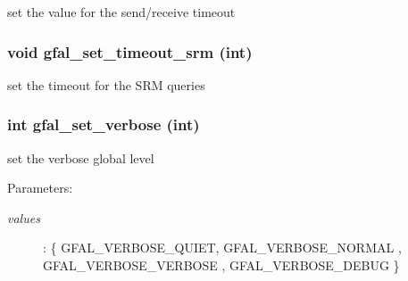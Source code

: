 set the value for the send/receive timeout 
\subsubsection{\setlength{\rightskip}{0pt plus 5cm}void gfal\_\-set\_\-timeout\_\-srm (int)}\label{group__common__group_gc0dac1437f150d4b5b8779f456050bec}


set the timeout for the SRM queries 
\subsubsection{\setlength{\rightskip}{0pt plus 5cm}int gfal\_\-set\_\-verbose (int)}\label{group__common__group_g331e181c2fadd801321ad43033835052}


set the verbose global level 

\begin{Desc}
\item[Parameters:]
\begin{description}
\item[{\em values}]: \{ GFAL\_\-VERBOSE\_\-QUIET, GFAL\_\-VERBOSE\_\-NORMAL , GFAL\_\-VERBOSE\_\-VERBOSE , GFAL\_\-VERBOSE\_\-DEBUG \} \end{description}
\end{Desc}
